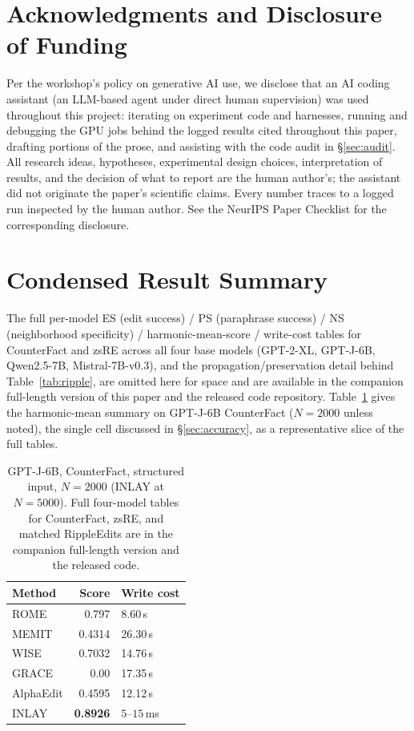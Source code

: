 \documentclass{article}
\begin{document}
\section*{Acknowledgments and Disclosure of Funding}

Per the workshop's policy on generative AI use, we disclose that an AI
coding assistant (an LLM-based agent under direct human supervision) was
used throughout this project: iterating on experiment code and harnesses,
running and debugging the GPU jobs behind the logged results cited
throughout this paper, drafting portions of the prose, and assisting with
the code audit in \S\ref{sec:audit}. All research ideas, hypotheses,
experimental design choices, interpretation of results, and the decision
of what to report are the human author's; the assistant did not originate
the paper's scientific claims. Every number traces to a logged run
inspected by the human author. See the NeurIPS Paper Checklist for the
corresponding disclosure.




\appendix

\section{Condensed Result Summary}
\label{sec:appendix-tables}

The full per-model ES (edit success) / PS (paraphrase success) / NS
(neighborhood specificity) / harmonic-mean-score / write-cost tables for
CounterFact and zsRE across all four base models (GPT-2-XL, GPT-J-6B,
Qwen2.5-7B, Mistral-7B-v0.3), and the propagation/preservation detail behind
Table~\ref{tab:ripple}, are omitted here for space and are available in the
companion full-length version of this paper and the released code
repository. Table~\ref{tab:appendix-summary} gives the harmonic-mean summary
on GPT-J-6B CounterFact ($N{=}2000$ unless noted), the single cell discussed
in \S\ref{sec:accuracy}, as a representative slice of the full tables.

\begin{table}[htbp]
  \centering
  \small
  \begin{tabular}{@{}lrl@{}}
    \toprule
    Method & Score & Write cost \\
    \midrule
    ROME       & 0.797  & 8.60\,s \\
    MEMIT      & 0.4314 & 26.30\,s \\
    WISE       & 0.7032 & 14.76\,s \\
    GRACE      & 0.00   & 17.35\,s \\
    AlphaEdit  & 0.4595 & 12.12\,s \\
    INLAY      & \textbf{0.8926} & $5$--$15$\,ms \\
    \bottomrule
  \end{tabular}
  \caption{GPT-J-6B, CounterFact, structured input, $N{=}2000$ (INLAY at
  $N{=}5000$). Full four-model tables for CounterFact, zsRE, and matched
  RippleEdits are in the companion full-length version and the released
  code.}
  \label{tab:appendix-summary}
\end{table}

\newpage

\end{document}
